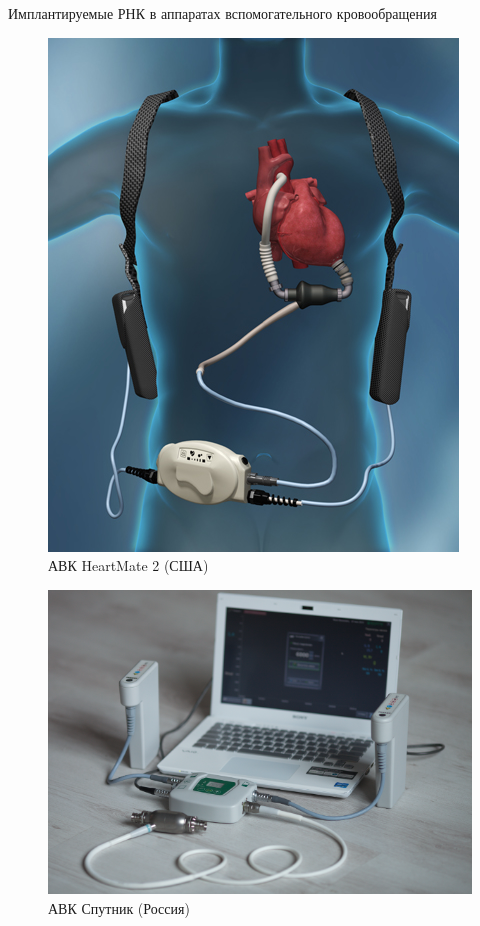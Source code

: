 \documentclass[a4paper, 9pt]{beamer}
\begin{document}
\begin{frame}{Имплантируемые РНК в аппаратах вспомогательного кровообращения}
\begin{minipage}[ht]{.28\textwidth}
\vskip-14pt
\begin{figure}
  \center
  \includegraphics[scale=0.75]{../images/hm_2_pres}
  \caption*{\footnotesize АВК HeartMate 2 (США)} 
\end{figure}

\end{minipage}\hfill
\begin{minipage}[ht]{.36\textwidth}
\centering

\begin{figure}
 \includegraphics[scale=0.5]{../images/sputnik_pres}
 \caption*{\footnotesize АВК Спутник (Россия)} 
\end{figure}


\end{minipage}
\end{frame}
\end{document}
